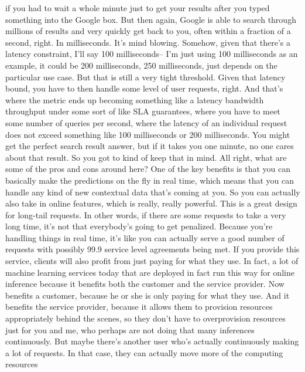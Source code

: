 {{{{{{{    if you had to wait a whole minute just to get your results after you
    typed something into the Google box.
    But then again, Google is able to search through millions of results
    and very quickly get back to you, often within a fraction of a second, right.
    In milliseconds.
    It's mind blowing.
    Somehow, given that there's a latency constraint, I'll say 100 milliseconds--
    I'm just using 100 milliseconds as an example, it could be 200 milliseconds,
    250 milliseconds, just depends on the particular use case.
    But that is still a very tight threshold.
    Given that latency bound, you have to then handle
    some level of user requests, right.
    And that's where the metric ends up becoming something
    like a latency bandwidth throughput under some sort of like SLA guarantees,
    where you have to meet some number of queries per second, where
    the latency of an individual request does not exceed something like 100
    milliseconds or 200 milliseconds.
    You might get the perfect search result answer, but if it takes you one minute,
    no one cares about that result. So you got to kind of keep that in mind.
    All right, what are some of the pros and cons around here?
    One of the key benefits is that you can basically
    make the predictions on the fly in real time, which
    means that you can handle any kind of new contextual data
    that's coming at you.
    So you can actually also take in online features,
    which is really, really powerful.
    This is a great design for long-tail requests.
    In other words, if there are some requests to take a very long time,
    it's not that everybody's going to get penalized.
    Because you're handling things in real time,
    it's like you can actually serve a good number of requests with possibly 99.9%
    service level agreements being met.
    If you provide this service, clients will also
    profit from just paying for what they use.
    In fact, a lot of machine learning services today
    that are deployed in fact run this way for online inference
    because it benefits both the customer and the service provider.
    Now benefits a customer, because he or she is only paying for what they use.
    And it benefits the service provider, because it allows them
    to provision resources appropriately behind the scenes,
    so they don't have to overprovision resources just
    for you and me, who perhaps are not doing
    that many inferences continuously.
    But maybe there's another user who's actually
    continuously making a lot of requests.
    In that case, they can actually move more of the computing resources
}}}}}}}
